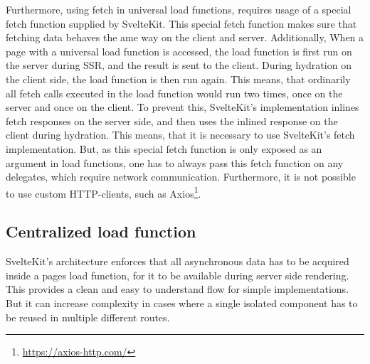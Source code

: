 



Furthermore, using fetch in universal load functions, requires usage of a special fetch function supplied by SvelteKit. This special fetch function makes sure that fetching data behaves the ame way on the client and server. Additionally, When a page with a universal load function is accessed, the load function is first run on the server during SSR, and the result is sent to the client. During hydration on the client side, the load function is then run again. This means, that ordinarily all fetch calls executed in the load function would run two times, once on the server and once on the client. To prevent this, SvelteKit's implementation inlines fetch responses on the server side, and then uses the inlined response on the client during hydration. This means, that it is necessary to use SvelteKit's fetch implementation. But, as this special fetch function is only exposed as an argument in load functions, one has to always pass this fetch function on any delegates, which require network communication. Furthermore, it is not possible to use custom HTTP-clients, such as Axios\footnote{\url{https://axios-http.com/}}.



\subsection{Centralized load function}
SvelteKit's architecture enforces that all asynchronous data has to be acquired inside a pages load function, for it to be available during server side rendering. This provides a clean and easy to understand flow for simple implementations. But it can increase complexity in cases where a single isolated component has to be reused in multiple different routes.

